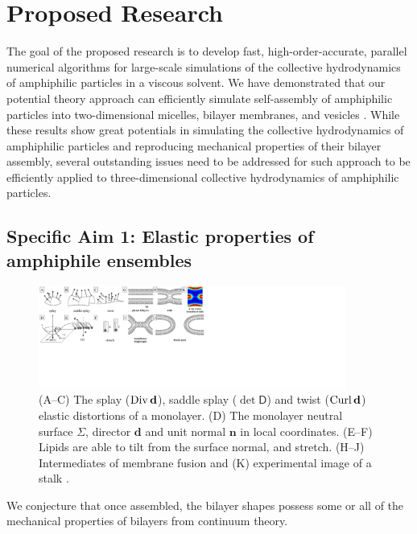 \section{Proposed Research}
\label{sec:proposed-work}
The goal of the proposed research is to develop fast,
high-order-accurate, parallel numerical algorithms for large-scale
simulations of the collective hydrodynamics of  amphiphilic particles in a viscous solvent.
%
We have demonstrated that 
our potential theory approach can efficiently simulate self-assembly of 
amphiphilic particles into two-dimensional micelles, bilayer membranes,
and vesicles \cite{Fu2018_SIAM}.
%
While these results show great potentials in simulating the collective hydrodynamics of amphiphilic particles and
reproducing mechanical properties of their bilayer assembly, 
several outstanding issues need to be addressed for such approach to be efficiently applied to three-dimensional 
collective hydrodynamics of amphiphilic particles.


\subsection{Specific Aim 1: Elastic properties of amphiphile ensembles}
\label{subsec:specific_aim_1}

\begin{figure}
\begin{center}
\includegraphics[width=0.9\textwidth]{figures/SA1_fig1.pdf}
\end{center}
\caption{\footnotesize (A--C) The splay ($\operatorname{Div} \mathbf{d}$), 
saddle splay ($\det \mathsf{D}$) and twist ($\operatorname{Curl} \mathbf{d}$) elastic distortions of 
a monolayer. (D) The monolayer neutral surface $\Sigma$,  
director $\mathbf{d}$ and unit normal $\mathbf{n}$ in local coordinates.
(E--F) Lipids are able to tilt from  the surface normal, and stretch.
(H--J) Intermediates of membrane fusion and (K) experimental image of a stalk \cite{Aeffner2012}. }
\label{fig:distortions}
\end{figure}


 We conjecture that 
once assembled, the bilayer shapes possess some or all of the mechanical properties of bilayers from continuum theory. 

